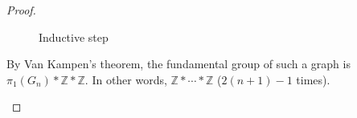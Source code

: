 \documentclass[12pt, psamsfonts]{amsart}
\theoremstyle{definition}
\theoremstyle{remark}
\numberwithin{equation}{section}
\begin{document}
\begin{proof}
\begin{itemize}
\begin{figure}
          \caption{Inductive step}
        \label{fig:ind}
      \end{figure}
      By Van Kampen's theorem, the fundamental group of such a graph is $\pi_1(G_n) * \mathbb{Z} * \mathbb{Z}$.
      In other words, $\mathbb{Z} * \cdots * \mathbb{Z}$ ($2(n + 1) - 1$ times).
  \end{itemize}
\end{proof}
\end{document}
